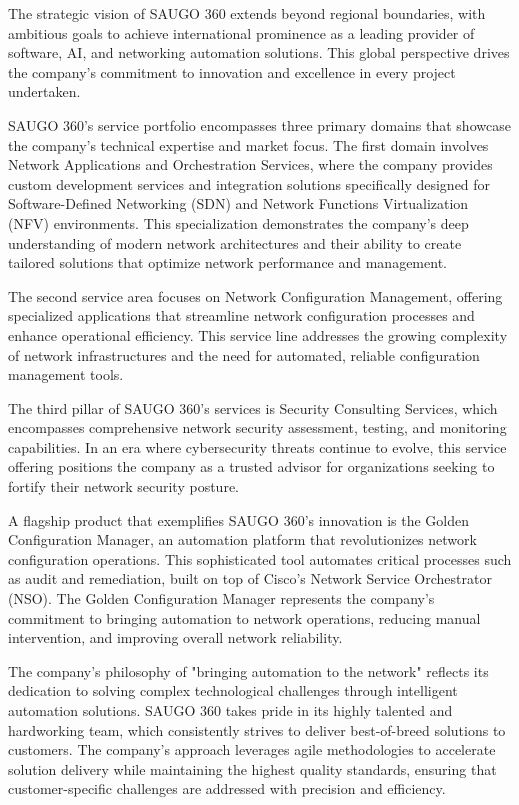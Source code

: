 \documentclass[12pt,a4paper]{article}
\begin{document}
The strategic vision of SAUGO 360 extends beyond regional boundaries, with ambitious goals to achieve international prominence as a leading provider of software, AI, and networking automation solutions. This global perspective drives the company's commitment to innovation and excellence in every project undertaken.

SAUGO 360's service portfolio encompasses three primary domains that showcase the company's technical expertise and market focus. The first domain involves Network Applications and Orchestration Services, where the company provides custom development services and integration solutions specifically designed for Software-Defined Networking (SDN) and Network Functions Virtualization (NFV) environments. This specialization demonstrates the company's deep understanding of modern network architectures and their ability to create tailored solutions that optimize network performance and management.

The second service area focuses on Network Configuration Management, offering specialized applications that streamline network configuration processes and enhance operational efficiency. This service line addresses the growing complexity of network infrastructures and the need for automated, reliable configuration management tools.

The third pillar of SAUGO 360's services is Security Consulting Services, which encompasses comprehensive network security assessment, testing, and monitoring capabilities. In an era where cybersecurity threats continue to evolve, this service offering positions the company as a trusted advisor for organizations seeking to fortify their network security posture.

A flagship product that exemplifies SAUGO 360's innovation is the Golden Configuration Manager, an automation platform that revolutionizes network configuration operations. This sophisticated tool automates critical processes such as audit and remediation, built on top of Cisco's Network Service Orchestrator (NSO). The Golden Configuration Manager represents the company's commitment to bringing automation to network operations, reducing manual intervention, and improving overall network reliability.

The company's philosophy of "bringing automation to the network" reflects its dedication to solving complex technological challenges through intelligent automation solutions. SAUGO 360 takes pride in its highly talented and hardworking team, which consistently strives to deliver best-of-breed solutions to customers. The company's approach leverages agile methodologies to accelerate solution delivery while maintaining the highest quality standards, ensuring that customer-specific challenges are addressed with precision and efficiency.
\end{document}
